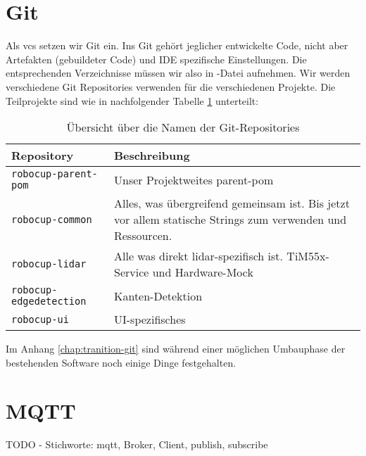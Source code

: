 \section{Git}
Als \acrshort{vcs} setzen wir Git ein. Ins Git gehört jeglicher entwickelte Code, nicht aber Artefakten (gebuildeter Code) und IDE spezifische Einstellungen. Die entsprechenden Verzeichnisse müssen wir also in -Datei aufnehmen. Wir werden verschiedene Git Repositories verwenden für die verschiedenen Projekte. Die Teilprojekte sind wie in nachfolgender Tabelle \ref{tab:gitRepositories} unterteilt:
\begin{table}[H]
	\centering
	\begin{tabular}{lp{13cm}} \toprule
		\textbf{Repository} & \textbf{Beschreibung}\\ \midrule
		\texttt{robocup-parent-pom} & Unser Projektweites parent-pom \\ \midrule
		\texttt{robocup-common}     & Alles, was übergreifend gemeinsam ist. Bis jetzt vor allem statische Strings zum verwenden und Ressourcen.\\ \midrule
		\texttt{robocup-lidar}  & Alle was direkt \acrshort{lidar}-spezifisch ist. TiM55x-Service und Hardware-Mock\\ \midrule
		\texttt{robocup-edgedetection}  & Kanten-Detektion\\ \midrule
		\texttt{robocup-ui}   & UI-spezifisches\\ \bottomrule
	\end{tabular}
	\caption{Übersicht über die Namen der Git-Repositories}
	\label{tab:gitRepositories}
\end{table}
Im Anhang \ref{chap:tranition-git} sind während einer möglichen Umbauphase der bestehenden Software noch einige Dinge festgehalten.

\section{MQTT}
\label{sec:mqtt}
TODO - Stichworte: \acrshort{mqtt}, Broker, Client, publish, subscribe
